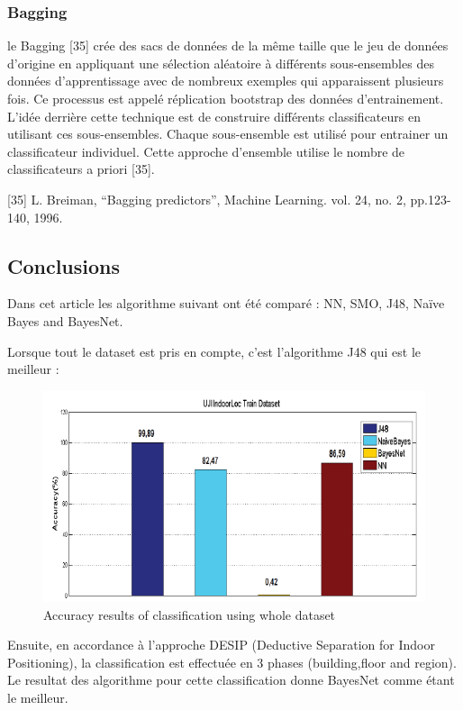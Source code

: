 \subsubsection{Bagging}
le Bagging [35] crée des sacs de données de la même taille que le jeu de données d'origine en appliquant une sélection aléatoire à différents sous-ensembles des données d'apprentissage avec de nombreux exemples qui apparaissent plusieurs fois. Ce processus est appelé réplication bootstrap des données d'entrainement. L'idée derrière cette technique est de construire différents classificateurs en utilisant ces sous-ensembles. Chaque sous-ensemble est utilisé pour entrainer un classificateur individuel. Cette approche d'ensemble utilise le nombre de classificateurs a priori [35].

[35] L. Breiman, “Bagging predictors”, Machine Learning. vol. 24, no. 2, pp.123-140, 1996.

\subsection{Conclusions}
Dans cet article les algorithme suivant ont été comparé : NN, SMO, J48, Naïve Bayes and BayesNet.

Lorsque tout le dataset est pris en compte, c'est l'algorithme J48 qui est le meilleur :

\begin{figure}[H]
	\begin{center}
		\includegraphics[scale=1]{figures/wholeDataset.png}
		\caption{Accuracy results of classification using whole dataset}
		\label{fig:wohledataset} %
	\end{center}
\end{figure}

Ensuite, en accordance à l'approche DESIP (Deductive Separation for Indoor Positioning), la classification est effectuée en 3 phases (building,floor and region). Le resultat des algorithme pour cette classification donne BayesNet comme étant le meilleur.

